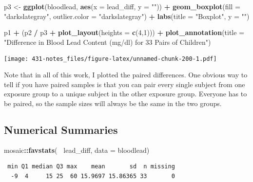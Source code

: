 \documentclass[
]{book}
\newenvironment{Shaded}{\begin{snugshade}}{\end{snugshade}}
\newcommand{\DataTypeTok}[1]{\textcolor[rgb]{0.13,0.29,0.53}{#1}}
\newcommand{\DecValTok}[1]{\textcolor[rgb]{0.00,0.00,0.81}{#1}}
\newcommand{\KeywordTok}[1]{\textcolor[rgb]{0.13,0.29,0.53}{\textbf{#1}}}
\newcommand{\NormalTok}[1]{#1}
\newcommand{\OperatorTok}[1]{\textcolor[rgb]{0.81,0.36,0.00}{\textbf{#1}}}
\newcommand{\StringTok}[1]{\textcolor[rgb]{0.31,0.60,0.02}{#1}}
\begin{document}
\begin{Shaded}
\begin{Highlighting}[]
\NormalTok{p3 <-}\StringTok{ }\KeywordTok{ggplot}\NormalTok{(bloodlead, }\KeywordTok{aes}\NormalTok{(}\DataTypeTok{x =}\NormalTok{ lead_diff, }\DataTypeTok{y =} \StringTok{""}\NormalTok{)) }\OperatorTok{+}
\StringTok{  }\KeywordTok{geom_boxplot}\NormalTok{(}\DataTypeTok{fill =} \StringTok{"darkslategray"}\NormalTok{, }\DataTypeTok{outlier.color =} \StringTok{"darkslategray"}\NormalTok{) }\OperatorTok{+}\StringTok{ }
\StringTok{  }\KeywordTok{labs}\NormalTok{(}\DataTypeTok{title =} \StringTok{"Boxplot"}\NormalTok{, }\DataTypeTok{y =} \StringTok{""}\NormalTok{)}

\NormalTok{p1 }\OperatorTok{+}\StringTok{ }\NormalTok{(p2 }\OperatorTok{/}\StringTok{ }\NormalTok{p3 }\OperatorTok{+}\StringTok{ }\KeywordTok{plot_layout}\NormalTok{(}\DataTypeTok{heights =} \KeywordTok{c}\NormalTok{(}\DecValTok{4}\NormalTok{,}\DecValTok{1}\NormalTok{))) }\OperatorTok{+}\StringTok{ }
\StringTok{    }\KeywordTok{plot_annotation}\NormalTok{(}\DataTypeTok{title =} \StringTok{"Difference in Blood Lead Content (mg/dl) for 33 Pairs of Children"}\NormalTok{)}
\end{Highlighting}
\end{Shaded}

\texttt{[image: 431-notes\_files/figure-latex/unnamed-chunk-200-1.pdf]}

Note that in all of this work, I plotted the paired differences. One obvious way to tell if you have paired samples is that you can pair every single subject from one exposure group to a unique subject in the other exposure group. Everyone has to be paired, so the sample sizes will always be the same in the two groups.

\hypertarget{numerical-summaries}{%
\subsection{Numerical Summaries}\label{numerical-summaries}}

\begin{Shaded}
\begin{Highlighting}[]
\NormalTok{mosaic}\OperatorTok{::}\KeywordTok{favstats}\NormalTok{(}\OperatorTok{~}\StringTok{ }\NormalTok{lead_diff, }\DataTypeTok{data =}\NormalTok{ bloodlead)}
\end{Highlighting}
\end{Shaded}

\begin{verbatim}
 min Q1 median Q3 max    mean       sd  n missing
  -9  4     15 25  60 15.9697 15.86365 33       0
\end{verbatim}
\end{document}
